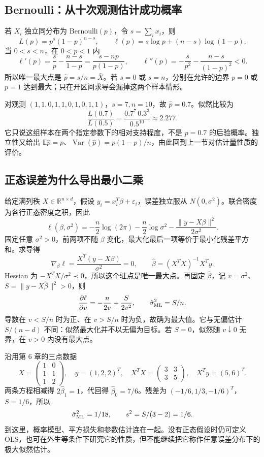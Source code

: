 \subsection{Bernoulli：从十次观测估计成功概率}
若 $X_i$ 独立同分布为 Bernoulli$(p)$，令 $s=\sum_i x_i$，则
\[
 L(p)=p^s(1-p)^{n-s},\qquad
 \ell(p)=s\log p+(n-s)\log(1-p).
\]
当 $0<s<n$，在 $0<p<1$ 内
\[
 \ell'(p)=\frac{s}{p}-\frac{n-s}{1-p}
 =\frac{s-np}{p(1-p)},\qquad
 \ell''(p)=-\frac{s}{p^2}-\frac{n-s}{(1-p)^2}<0.
\]
所以唯一最大点是 $\hat p=s/n=\bar X$。若 $s=0$ 或 $s=n$，分别在允许的边界 $p=0$ 或 $p=1$ 达到最大；只在开区间求导会漏掉这两个样本情形。

对观测 $(1,1,0,1,1,0,1,0,1,1)$，$s=7,n=10$，故 $\hat p=0.7$。似然比较为
\[
 \frac{L(0.7)}{L(0.5)}
 =\frac{0.7^7\,0.3^3}{0.5^{10}}\approx2.277.
\]
它只说这组样本在两个指定参数下的相对支持程度，不是 $p=0.7$ 的后验概率。独立性又给出 $\mathbb E\hat p=p$、$\operatorname{Var}(\hat p)=p(1-p)/n$，由此回到上一节对估计量性质的评价。

\subsection{正态误差为什么导出最小二乘}
给定满列秩 $X\in\mathbb R^{n\times d}$，假设
$y_i=x_i^T\beta+\varepsilon_i$，误差独立服从 $N(0,\sigma^2)$。联合密度为各行正态密度之积，因此
\[
 \ell(\beta,\sigma^2)
 =-\frac n2\log(2\pi)-\frac n2\log\sigma^2
 -\frac{\|y-X\beta\|^2}{2\sigma^2}.
\]
固定任意 $\sigma^2>0$，前两项不随 $\beta$ 变化，最大化最后一项等价于最小化残差平方和。求导得
\[
 \nabla_\beta\ell=\frac{X^T(y-X\beta)}{\sigma^2}=0,
 \qquad \hat\beta=(X^TX)^{-1}X^Ty.
\]
Hessian 为 $-X^TX/\sigma^2\prec0$，所以这个驻点是唯一最大点。再固定 $\hat\beta$，记 $v=\sigma^2$、$S=\|y-X\hat\beta\|^2>0$，则
\[
 \frac{\partial\ell}{\partial v}=-\frac n{2v}+\frac S{2v^2},
 \qquad \hat\sigma^2_{\rm ML}=S/n.
\]
导数在 $v<S/n$ 时为正、在 $v>S/n$ 时为负，故确为最大值。它与无偏估计 $S/(n-d)$ 不同：似然最大化并不以无偏为目标。若 $S=0$，似然随 $v\downarrow0$ 无界，在 $v>0$ 内没有最大点。

沿用第 6 章的三点数据
\[
 X=\begin{pmatrix}1&0\\1&1\\1&2\end{pmatrix},\quad y=(1,2,2)^T,
 \quad X^TX=\begin{pmatrix}3&3\\3&5\end{pmatrix},\quad X^Ty=(5,6)^T.
\]
两条方程相减得 $2\hat\beta_1=1$，代回得 $\hat\beta_0=7/6$。残差为 $(-1/6,1/3,-1/6)^T$，$S=1/6$，所以
\[
 \hat\sigma^2_{\rm ML}=1/18,\qquad s^2=S/(3-2)=1/6.
\]
到这里，概率模型、平方损失和参数估计连在一起。没有正态假设时仍可定义 OLS，也可在外生等条件下研究它的性质，但不能继续把它称作任意误差分布下的极大似然估计。

